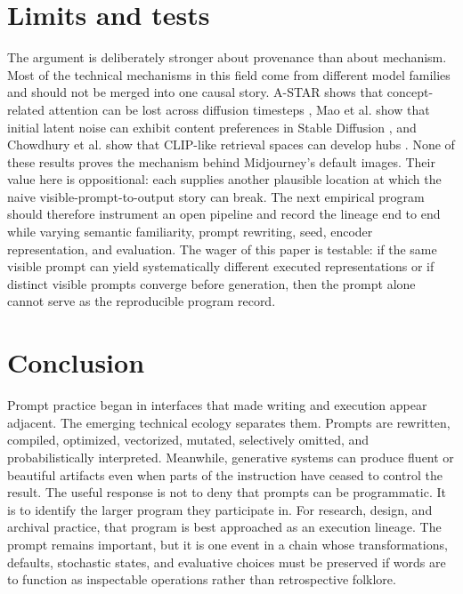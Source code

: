 \documentclass[11pt]{article}
\begin{document}
\section{Limits and tests}
The argument is deliberately stronger about provenance than about mechanism. Most of the technical mechanisms in this field come from different model families and should not be merged into one causal story. A-STAR shows that concept-related attention can be lost across diffusion timesteps \citep{Agarwal2023ASTAR}, Mao et al. show that initial latent noise can exhibit content preferences in Stable Diffusion \citep{Mao2023InitialImageEditing}, and Chowdhury et al. show that CLIP-like retrieval spaces can develop hubs \citep{Chowdhury2024NNN}. None of these results proves the mechanism behind Midjourney's default images. Their value here is oppositional: each supplies another plausible location at which the naive visible-prompt-to-output story can break. The next empirical program should therefore instrument an open pipeline and record the lineage end to end while varying semantic familiarity, prompt rewriting, seed, encoder representation, and evaluation. The wager of this paper is testable: if the same visible prompt can yield systematically different executed representations or if distinct visible prompts converge before generation, then the prompt alone cannot serve as the reproducible program record.
\section{Conclusion}
Prompt practice began in interfaces that made writing and execution appear adjacent. The emerging technical ecology separates them. Prompts are rewritten, compiled, optimized, vectorized, mutated, selectively omitted, and probabilistically interpreted. Meanwhile, generative systems can produce fluent or beautiful artifacts even when parts of the instruction have ceased to control the result. The useful response is not to deny that prompts can be programmatic. It is to identify the larger program they participate in. For research, design, and archival practice, that program is best approached as an execution lineage. The prompt remains important, but it is one event in a chain whose transformations, defaults, stochastic states, and evaluative choices must be preserved if words are to function as inspectable operations rather than retrospective folklore.
\end{document}
